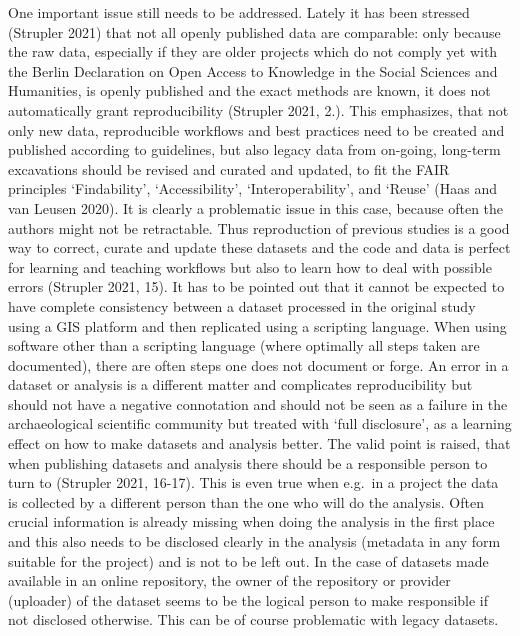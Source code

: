 \documentclass[
]{article}
\begin{document}
One important issue still needs to be addressed. Lately it has been stressed (Strupler 2021) that not all openly published data are comparable: only because the raw data, especially if they are older projects which do not comply yet with the Berlin Declaration on Open Access to Knowledge in the Social Sciences and Humanities, is openly published and the exact methods are known, it does not automatically grant reproducibility (Strupler 2021, 2.). This emphasizes, that not only new data, reproducible workflows and best practices need to be created and published according to guidelines, but also legacy data from on-going, long-term excavations should be revised and curated and updated, to fit the FAIR principles `Findability', `Accessibility', `Interoperability', and `Reuse' (Haas and van Leusen 2020). It is clearly a problematic issue in this case, because often the authors might not be retractable. Thus reproduction of previous studies is a good way to correct, curate and update these datasets and the code and data is perfect for learning and teaching workflows but also to learn how to deal with possible errors (Strupler 2021, 15). It has to be pointed out that it cannot be expected to have complete consistency between a dataset processed in the original study using a GIS platform and then replicated using a scripting language. When using software other than a scripting language (where optimally all steps taken are documented), there are often steps one does not document or forge. An error in a dataset or analysis is a different matter and complicates reproducibility but should not have a negative connotation and should not be seen as a failure in the archaeological scientific community but treated with `full disclosure', as a learning effect on how to make datasets and analysis better. The valid point is raised, that when publishing datasets and analysis there should be a responsible person to turn to (Strupler 2021, 16-17). This is even true when e.g.~in a project the data is collected by a different person than the one who will do the analysis. Often crucial information is already missing when doing the analysis in the first place and this also needs to be disclosed clearly in the analysis (metadata in any form suitable for the project) and is not to be left out. In the case of datasets made available in an online repository, the owner of the repository or provider (uploader) of the dataset seems to be the logical person to make responsible if not disclosed otherwise. This can be of course problematic with legacy datasets.
\end{document}
